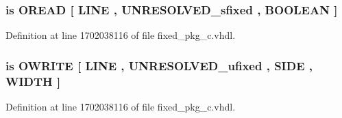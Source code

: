 \subsubsection[{O\+C\+T\+A\+L\+\_\+\+R\+E\+A\+D}]{ {\bfseries \textcolor{keywordflow}{is}\textcolor{vhdlchar}{ }\textcolor{vhdlchar}{O\+R\+E\+A\+D}\textcolor{vhdlchar}{ }\textcolor{vhdlchar}{\mbox{[}}\textcolor{vhdlchar}{ }\textcolor{vhdlchar}{L\+I\+N\+E}\textcolor{vhdlchar}{ }\textcolor{vhdlchar}{,}\textcolor{vhdlchar}{ }{\bfseries {\bf U\+N\+R\+E\+S\+O\+L\+V\+E\+D\+\_\+sfixed}} \textcolor{vhdlchar}{ }\textcolor{vhdlchar}{,}\textcolor{vhdlchar}{ }\textcolor{comment}{B\+O\+O\+L\+E\+A\+N}\textcolor{vhdlchar}{ }\textcolor{vhdlchar}{\mbox{]}}\textcolor{vhdlchar}{ }} \hspace{0.3cm}{\ttfamily [Alias]}}\label{classfixed__pkg_a0d43978dadf4fc835a91a1460e5778b7}


Definition at line 1702038116 of file fixed\+\_\+pkg\+\_\+c.\+vhdl.

\hypertarget{classfixed__pkg_af7bf14320656c70f9260aecbff34ecea}{}
\subsubsection[{O\+C\+T\+A\+L\+\_\+\+W\+R\+I\+T\+E}]{ {\bfseries \textcolor{keywordflow}{is}\textcolor{vhdlchar}{ }\textcolor{vhdlchar}{O\+W\+R\+I\+T\+E}\textcolor{vhdlchar}{ }\textcolor{vhdlchar}{\mbox{[}}\textcolor{vhdlchar}{ }\textcolor{vhdlchar}{L\+I\+N\+E}\textcolor{vhdlchar}{ }\textcolor{vhdlchar}{,}\textcolor{vhdlchar}{ }{\bfseries {\bf U\+N\+R\+E\+S\+O\+L\+V\+E\+D\+\_\+ufixed}} \textcolor{vhdlchar}{ }\textcolor{vhdlchar}{,}\textcolor{vhdlchar}{ }\textcolor{vhdlchar}{S\+I\+D\+E}\textcolor{vhdlchar}{ }\textcolor{vhdlchar}{,}\textcolor{vhdlchar}{ }\textcolor{vhdlchar}{W\+I\+D\+T\+H}\textcolor{vhdlchar}{ }\textcolor{vhdlchar}{\mbox{]}}\textcolor{vhdlchar}{ }} \hspace{0.3cm}{\ttfamily [Alias]}}\label{classfixed__pkg_af7bf14320656c70f9260aecbff34ecea}


Definition at line 1702038116 of file fixed\+\_\+pkg\+\_\+c.\+vhdl.

\hypertarget{classfixed__pkg_a8d2e6245c720509e99289ab1f28d13b2}{}
